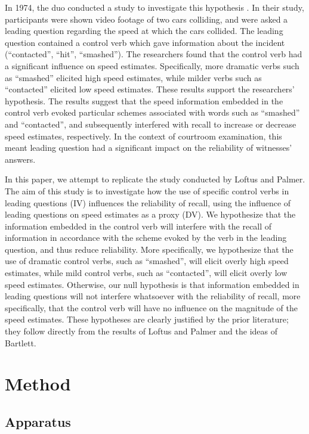 \documentclass[a4paper,11pt]{report}
\begin{document}
In 1974, the duo conducted a study to investigate this hypothesis \cite{lap}.
In their study, participants were shown video footage of two cars colliding,
and were asked a leading question regarding the speed at which the cars
collided. The leading question contained a control verb which gave information
about the incident (“contacted”, “hit”, “smashed”). The researchers found that
the control verb had a significant influence on speed estimates. Specifically,
more dramatic verbs such as “smashed” elicited high speed estimates, while
milder verbs such as “contacted” elicited low speed estimates. These results
support the researchers’ hypothesis. The results suggest that the speed
information embedded in the control verb evoked particular schemes associated
with words such as “smashed” and “contacted”, and subsequently interfered with
recall to increase or decrease speed estimates, respectively. In the context of
courtroom examination, this meant leading question had a significant impact on
the reliability of witnesses’ answers.

In this paper, we attempt to replicate the study conducted by Loftus and
Palmer. The aim of this study is to investigate how the use of specific control
verbs in leading questions (IV) influences the reliability of recall, using the
influence of leading questions on speed estimates as a proxy (DV). We
hypothesize that the information embedded in the control verb will interfere
with the recall of information in accordance with the scheme evoked by the verb
in the leading question, and thus reduce reliability. More specifically, we
hypothesize that the use of dramatic control verbs, such as “smashed”, will
elicit overly high speed estimates, while mild control verbs, such as
“contacted”, will elicit overly low speed estimates. Otherwise, our null
hypothesis is that information embedded in leading questions will not interfere
whatsoever with the reliability of recall, more specifically, that the control
verb will have no influence on the magnitude of the speed estimates. These
hypotheses are clearly justified by the prior literature; they follow directly
from the results of Loftus and Palmer and the ideas of Bartlett.

\section{Method}

\subsection{Apparatus}
\end{document}
